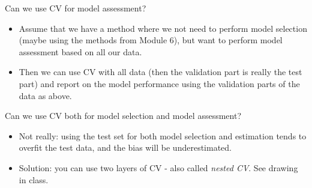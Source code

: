 \documentclass[10pt,ignorenonframetext,]{beamer}
\begin{document}
\begin{frame}

\begin{block}{Can we use CV for model assessment?}

\vspace{2mm}

\begin{itemize}
\item
  Assume that we have a method where we not need to perform model
  selection (maybe using the methods from Module 6), but want to perform
  model assessment based on all our data.
\item
  Then we can use CV with all data (then the validation part is really
  the test part) and report on the model performance using the
  validation parts of the data as above.
\end{itemize}

\vspace{2mm}

\end{block}

\begin{block}{Can we use CV both for model selection and model
assessment?}

\vspace{2mm}

\begin{itemize}
\item
  Not really: using the test set for both model selection and estimation
  tends to overfit the test data, and the bias will be underestimated.
\item
  Solution: you can use two layers of CV - also called \emph{nested CV}.
  See drawing in class.
\end{itemize}

\end{block}

\end{frame}
\end{document}
